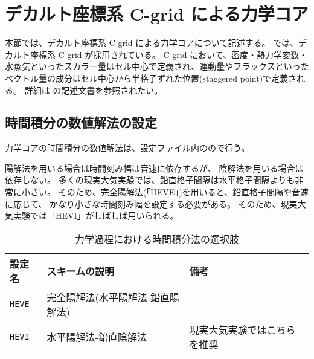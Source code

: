 \section{デカルト座標系 C-grid による力学コア} \label{sec:atmos_dyn_cartesC}
本節では、デカルト座標系 C-grid による力学コアについて記述する。
\scalerm では、デカルト座標系 C-grid が採用されている。
C-grid において、密度・熱力学変数・水蒸気といったスカラー量はセル中心で定義され、運動量やフラックスといったベクトル量の成分はセル中心から半格子ずれた位置(staggered point)で定義される。
詳細は \scalerm の記述文書を参照されたい。


\subsection{時間積分の数値解法の設定}  %
力学コアの時間積分の数値解法は、設定ファイル内のので行う。

陽解法を用いる場合は時間刻み幅は音速に依存するが、
陰解法を用いる場合は依存しない。
多くの現実大気実験では、鉛直格子間隔は水平格子間隔よりも非常に小さい。
そのため、完全陽解法(「HEVE」)を用いると、鉛直格子間隔や音速に応じて、
かなり小さな時間刻み幅を設定する必要がある。
そのため、現実大気実験では「HEVI」がしばしば用いられる。

\begin{table}[h]
\begin{center}
  \caption{力学過程における時間積分法の選択肢}
  \label{tab:nml_dyn}
  \begin{tabularx}{150mm}{llX} \hline
    \rowcolor[gray]{0.9}  設定名 & スキームの説明 & 備考\\ \hline
      \verb|HEVE|  & 完全陽解法(水平陽解法-鉛直陽解法) & \\
      \verb|HEVI|  & 水平陽解法-鉛直陰解法 & 現実大気実験ではこちらを推奨\\
    \hline
  \end{tabularx}
\end{center}
\end{table}


